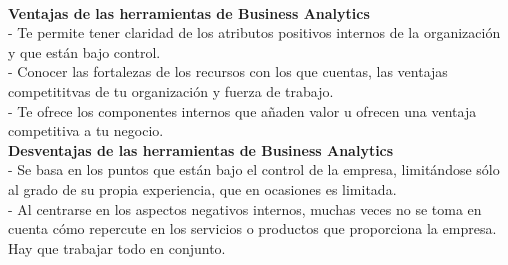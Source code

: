 \documentclass[%
 reprint,
 amsmath,amssymb,
 aps,
]{revtex4-1}
\begin{document}
\\
\textbf{ Ventajas de las herramientas de Business Analytics}\\
- Te permite tener claridad de los atributos positivos internos de la organización y que están bajo control.\\
- Conocer las fortalezas de los recursos con los que cuentas, las ventajas competititvas de tu organización y fuerza de trabajo.\\
- Te ofrece los componentes internos que añaden valor u ofrecen una ventaja competitiva a tu negocio.\\
\textbf{ Desventajas de las herramientas de Business Analytics}\\
- Se basa en los puntos que están bajo el control de la empresa, limitándose sólo al grado de su propia experiencia, que en ocasiones es limitada.\\
- Al centrarse en los aspectos negativos internos, muchas veces no se toma en cuenta cómo repercute en los servicios o productos que proporciona la empresa. Hay que trabajar todo en conjunto.\\
\end{document}
